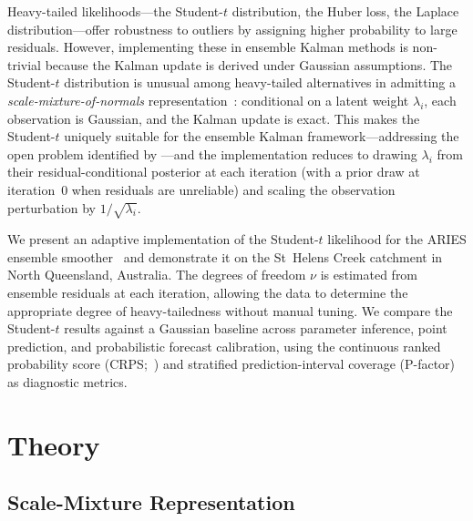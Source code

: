 \documentclass[article,nojss]{jss}
\begin{document}
Heavy-tailed likelihoods---the Student-$t$ distribution, the Huber loss,
the Laplace distribution---offer robustness to outliers by assigning
higher probability to large residuals.
However, implementing these in ensemble Kalman methods is non-trivial
because the Kalman update is derived under Gaussian assumptions.
The Student-$t$ distribution is unusual among heavy-tailed alternatives in
admitting a \emph{scale-mixture-of-normals} representation~\cite{West1987}:
conditional on a latent weight $\lambda_i$, each observation is Gaussian,
and the Kalman update is exact.
This makes the Student-$t$ uniquely suitable for the ensemble Kalman
framework---addressing the open problem identified by
\cite{Review2025}---and the implementation reduces to drawing
$\lambda_i$ from their
residual-conditional posterior at each iteration (with a prior draw at
iteration~0 when residuals are unreliable) and scaling the observation
perturbation by $1/\sqrt{\lambda_i}$.

We present an adaptive implementation of the Student-$t$ likelihood for
the ARIES ensemble smoother~\cite{Bennett2026} and demonstrate it on the
St~Helens Creek catchment in North Queensland, Australia.
The degrees of freedom $\nu$ is estimated from ensemble residuals at each
iteration, allowing the data to determine the appropriate degree of
heavy-tailedness without manual tuning.
We compare the Student-$t$ results against a Gaussian baseline across
parameter inference, point prediction, and probabilistic forecast
calibration, using the continuous ranked probability score
(CRPS;~\cite{Gneiting2007}) and stratified prediction-interval coverage
(P-factor) as diagnostic metrics.

\section{Theory}

\subsection{Scale-Mixture Representation}
\end{document}
